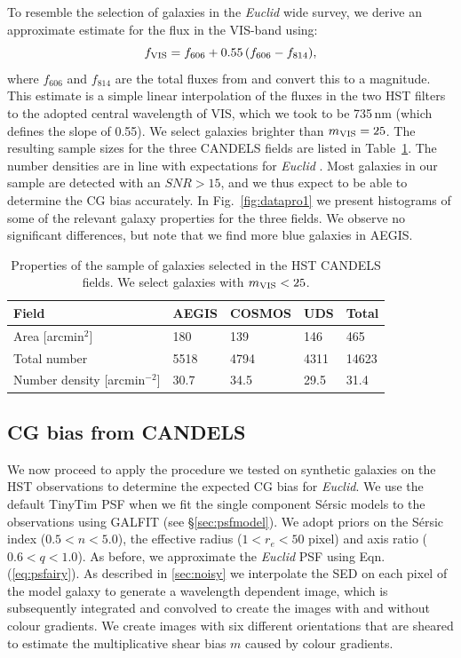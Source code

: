 \documentclass[useAMS,usenatbib]{mnras}
\newcommand{\be}{\begin{equation}}
\newcommand{\ee}{\end{equation}}
\begin{document}
To resemble the selection of galaxies in the {\it Euclid}  wide survey, we derive an approximate estimate for the flux in the VIS-band using:
%
\be
f_{\rm VIS}=f_{606}+ 0.55\,(f_{606}-f_{814}),
\ee
%
where $f_{606}$ and $f_{814}$ are the total fluxes from \cite{skelton14} and convert this to a magnitude. This estimate is a simple linear interpolation of the fluxes in the two HST filters to the adopted central wavelength of VIS, which we took to be 735\,nm (which defines the slope of 0.55). We select galaxies brighter than $m_{\rm VIS}=25$.  The resulting sample sizes for the  three CANDELS fields are listed in Table~\ref{table:mag}. The number densities are in line with expectations for {\it Euclid} \citep{Laureijs11}.
Most galaxies in our sample are detected with an $SNR>15$, and we thus  expect to be able to determine the CG bias accurately.  In Fig.~\ref{fig:datapro1} we present histograms of some of the relevant galaxy properties for the three fields. We observe no significant differences, but note that we find more blue galaxies in AEGIS.

\begin{center}
\begin{table}
  \begin{tabular}{lllll}
    \hline
    Field               &AEGIS   &COSMOS   &UDS  &Total\\
    \hline
    Area [arcmin$^2$]  	 		&180      & 139     &146    & 465\\
    Total number                 		 	& 5518    & 4794  & 4311  &14623\\
    Number density [arcmin$^{-2}$]     & 30.7    & 34.5   & 29.5   &31.4\\
    \hline
  \end{tabular}
  \caption{\label{table:mag} 
Properties of the sample of galaxies selected in the HST CANDELS fields. We 
select galaxies with $m_{\rm VIS}<25$.}
\end{table}
\end{center}
%

\subsection{CG bias from CANDELS}

We now proceed to apply the procedure we tested on synthetic galaxies on the HST observations to determine the expected CG bias for {\it Euclid}. We use the default {\sc TinyTim} PSF when we fit the single component S{\'e}rsic models to the observations using {\sc GALFIT} (see \S\ref{sec:psfmodel}).
We adopt priors on the S{\'e}rsic index ($0.5<n<5.0$), the effective radius ($1<r_e<50$ pixel) and axis ratio ($0.6<q<1.0$). As before, we approximate the {\it Euclid} PSF using Eqn.\,(\ref{eq:psfairy}).  As described in \ref{sec:noisy} we interpolate the SED on each pixel of the model galaxy to generate a wavelength dependent image, which is subsequently integrated and convolved to  create the images with and without colour gradients. We create images with six different orientations that are sheared to estimate the multiplicative shear bias $m$ caused by colour gradients.
\end{document}
